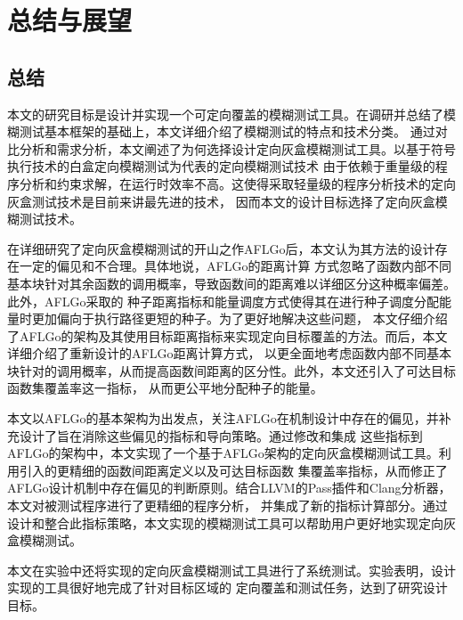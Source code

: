 \documentclass[bachelor]{njupthesis}
\begin{document}
\chapter{总结与展望}
\section{总结}
本文的研究目标是设计并实现一个可定向覆盖的模糊测试工具。在调研并总结了模糊测试基本框架的基础上，本文详细介绍了模糊测试的特点和技术分类。
通过对比分析和需求分析，本文阐述了为何选择设计定向灰盒模糊测试工具。以基于符号执行技术的白盒定向模糊测试为代表的定向模糊测试技术
由于依赖于重量级的程序分析和约束求解，在运行时效率不高。这使得采取轻量级的程序分析技术的定向灰盒测试技术是目前来讲最先进的技术，
因而本文的设计目标选择了定向灰盒模糊测试技术。

在详细研究了定向灰盒模糊测试的开山之作AFLGo后，本文认为其方法的设计存在一定的偏见和不合理。具体地说，AFLGo的距离计算
方式忽略了函数内部不同基本块针对其余函数的调用概率，导致函数间的距离难以详细区分这种概率偏差。此外，AFLGo采取的
种子距离指标和能量调度方式使得其在进行种子调度分配能量时更加偏向于执行路径更短的种子。为了更好地解决这些问题，
本文仔细介绍了AFLGo的架构及其使用目标距离指标来实现定向目标覆盖的方法。而后，本文详细介绍了重新设计的AFLGo距离计算方式，
以更全面地考虑函数内部不同基本块针对的调用概率，从而提高函数间距离的区分性。此外，本文还引入了可达目标函数集覆盖率这一指标，
从而更公平地分配种子的能量。

本文以AFLGo的基本架构为出发点，关注AFLGo在机制设计中存在的偏见，并补充设计了旨在消除这些偏见的指标和导向策略。通过修改和集成
这些指标到AFLGo的架构中，本文实现了一个基于AFLGo架构的定向灰盒模糊测试工具。利用引入的更精细的函数间距离定义以及可达目标函数
集覆盖率指标，从而修正了AFLGo设计机制中存在偏见的判断原则。结合LLVM的Pass插件和Clang分析器，本文对被测试程序进行了更精细的程序分析，
并集成了新的指标计算部分。通过设计和整合此指标策略，本文实现的模糊测试工具可以帮助用户更好地实现定向灰盒模糊测试。

本文在实验中还将实现的定向灰盒模糊测试工具进行了系统测试。实验表明，设计实现的工具很好地完成了针对目标区域的
定向覆盖和测试任务，达到了研究设计目标。
\end{document}
